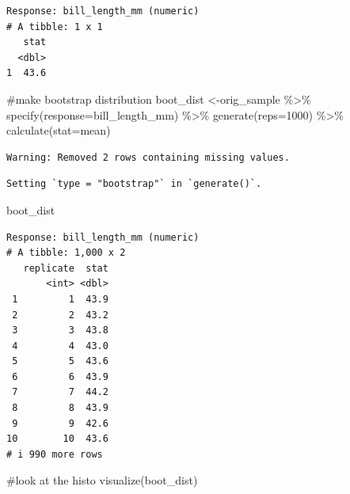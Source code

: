 \documentclass[
  letterpaper,
  DIV=11,
  numbers=noendperiod]{scrartcl}
\newenvironment{Shaded}{\begin{snugshade}}{\end{snugshade}}
\newcommand{\AttributeTok}[1]{\textcolor[rgb]{0.40,0.45,0.13}{#1}}
\newcommand{\CommentTok}[1]{\textcolor[rgb]{0.37,0.37,0.37}{#1}}
\newcommand{\DecValTok}[1]{\textcolor[rgb]{0.68,0.00,0.00}{#1}}
\newcommand{\FunctionTok}[1]{\textcolor[rgb]{0.28,0.35,0.67}{#1}}
\newcommand{\NormalTok}[1]{\textcolor[rgb]{0.00,0.23,0.31}{#1}}
\newcommand{\OtherTok}[1]{\textcolor[rgb]{0.00,0.23,0.31}{#1}}
\newcommand{\SpecialCharTok}[1]{\textcolor[rgb]{0.37,0.37,0.37}{#1}}
\newcommand{\StringTok}[1]{\textcolor[rgb]{0.13,0.47,0.30}{#1}}
\begin{document}
\begin{verbatim}
Response: bill_length_mm (numeric)
# A tibble: 1 x 1
   stat
  <dbl>
1  43.6
\end{verbatim}

\begin{Shaded}
\begin{Highlighting}[]
\CommentTok{\#make bootstrap distribution }
\NormalTok{boot\_dist }\OtherTok{\textless{}{-}}\NormalTok{orig\_sample }\SpecialCharTok{\%\textgreater{}\%}
  \FunctionTok{specify}\NormalTok{(}\AttributeTok{response=}\NormalTok{bill\_length\_mm) }\SpecialCharTok{\%\textgreater{}\%}
  \FunctionTok{generate}\NormalTok{(}\AttributeTok{reps=}\DecValTok{1000}\NormalTok{) }\SpecialCharTok{\%\textgreater{}\%}
  \FunctionTok{calculate}\NormalTok{(}\AttributeTok{stat=}\StringTok{\textquotesingle{}mean\textquotesingle{}}\NormalTok{)}
\end{Highlighting}
\end{Shaded}

\begin{verbatim}
Warning: Removed 2 rows containing missing values.
\end{verbatim}

\begin{verbatim}
Setting `type = "bootstrap"` in `generate()`.
\end{verbatim}

\begin{Shaded}
\begin{Highlighting}[]
\NormalTok{boot\_dist}
\end{Highlighting}
\end{Shaded}

\begin{verbatim}
Response: bill_length_mm (numeric)
# A tibble: 1,000 x 2
   replicate  stat
       <int> <dbl>
 1         1  43.9
 2         2  43.2
 3         3  43.8
 4         4  43.0
 5         5  43.6
 6         6  43.9
 7         7  44.2
 8         8  43.9
 9         9  42.6
10        10  43.6
# i 990 more rows
\end{verbatim}

\begin{Shaded}
\begin{Highlighting}[]
\CommentTok{\#look at the histo}
\FunctionTok{visualize}\NormalTok{(boot\_dist)}
\end{Highlighting}
\end{Shaded}
\end{document}
